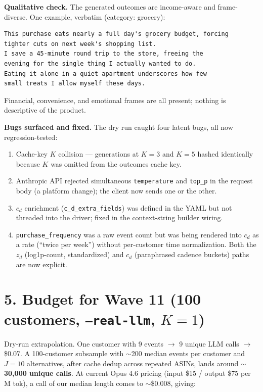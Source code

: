 \documentclass[11pt]{article}
\begin{document}
\textbf{Qualitative check.} The generated outcomes are income-aware and frame-diverse. One example, verbatim (category: grocery):

\begin{Verbatim}[fontsize=\small,frame=single,xleftmargin=1em]
This purchase eats nearly a full day's grocery budget, forcing
tighter cuts on next week's shopping list.
I save a 45-minute round trip to the store, freeing the
evening for the single thing I actually wanted to do.
Eating it alone in a quiet apartment underscores how few
small treats I allow myself these days.
\end{Verbatim}

Financial, convenience, and emotional frames are all present; nothing is descriptive of the product.

\textbf{Bugs surfaced and fixed.} The dry run caught four latent bugs, all now regression-tested:

\begin{enumerate}
\item Cache-key $K$ collision --- generations at $K=3$ and $K=5$ hashed identically because $K$ was omitted from the outcomes cache key.
\item Anthropic API rejected simultaneous \texttt{temperature} and \texttt{top\_p} in the request body (a platform change); the client now sends one or the other.
\item $c_d$ enrichment (\texttt{c\_d\_extra\_fields}) was defined in the YAML but not threaded into the driver; fixed in the context-string builder wiring.
\item \texttt{purchase\_frequency} was a raw event count but was being rendered into $c_d$ as a rate (``twice per week'') without per-customer time normalization. Both the $z_d$ (log1p-count, standardized) and $c_d$ (paraphrased cadence buckets) paths are now explicit.
\end{enumerate}

\section*{5. Budget for Wave 11 (100 customers, \texttt{--real-llm}, $K=1$)}

Dry-run extrapolation. One customer with 9 events $\to$ 9 unique LLM calls $\to$ \$0.07. A 100-customer subsample with $\sim$200 median events per customer and $J=10$ alternatives, after cache dedup across repeated ASINs, lands around \textbf{$\sim$30{,}000 unique calls}. At current Opus 4.6 pricing (input \$15 / output \$75 per M tok), a call of our median length comes to $\sim$\$0.008, giving:
\end{document}
